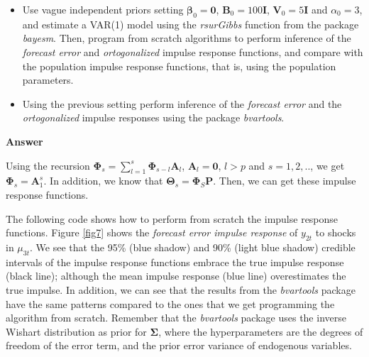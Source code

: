 \begin{enumerate}[leftmargin=*]
\begin{itemize}
	\item  Use vague independent priors setting $\bm{\beta}_0=\bm{0}$, $\bm{B}_0=100\bm{I}$, $\bm{V}_0=5\bm{I}$ and $\alpha_0=3$, and estimate a VAR(1) model using the \textit{rsurGibbs} function from the package \textit{bayesm}. Then, program from scratch algorithms to perform inference of the \textit{forecast error} and \textit{ortogonalized} impulse response functions, and compare with the population impulse response functions, that is, using the population parameters.
	
	\item Using the previous setting perform inference of the \textit{forecast error} and the \textit{ortogonalized} impulse responses using the package \textit{bvartools}.  
\end{itemize}

\textbf{Answer}

Using the recursion $\bm{\Phi}_s=\sum_{l=1}^s\bm{\Phi}_{s-l}\bm{A}_l$, $\bm{A}_l=\bm{0}$, $l>p$ and $s=1,2,..$, we get $\bm{\Phi}_s = \bm{A}_1^s$. In addition, we know that $\bm{\Theta}_s=\bm{\Phi}_S\bm{P}$. Then, we can get these impulse response functions. 

The following code shows how to perform from scratch the impulse response functions. Figure \ref{fig7} shows the \textit{forecast error impulse response} of $y_{2t}$ to shocks in $\mu_{3t}$. We see that the 95\% (blue shadow) and 90\% (light blue shadow) credible intervals of the impulse response functions embrace the true impulse response (black line); although the mean impulse response (blue line) overestimates the true impulse. In addition, we can see that the results from the \textit{bvartools} package have the same patterns compared to the ones that we get programming the algorithm from scratch. Remember that the \textit{bvartools} package uses the inverse Wishart distribution as prior for $\bm{\Sigma}$, where the hyperparameters are the degrees of freedom of the error term, and the prior error variance of endogenous variables.   


\end{enumerate}
